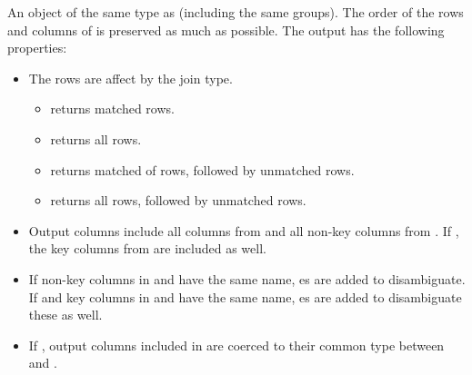 \documentclass[a4paper]{book}
\begin{document}
\begin{Value}
An object of the same type as  (including the same groups). The order of
the rows and columns of  is preserved as much as possible. The output has
the following properties:
\begin{itemize}

\item{} The rows are affect by the join type.
\begin{itemize}

\item{}  returns matched  rows.
\item{}  returns all  rows.
\item{}   returns matched of  rows, followed by unmatched  rows.
\item{}   returns all  rows, followed by unmatched  rows.

\end{itemize}

\item{} Output columns include all columns from  and all non-key columns from
. If , the key columns from  are included as well.
\item{} If non-key columns in  and  have the same name, es are added
to disambiguate. If  and key columns in  and  have
the same name, es are added to disambiguate these as well.
\item{} If , output columns included in  are coerced to their
common type between  and .

\end{itemize}

\end{Value}
%
\end{document}
